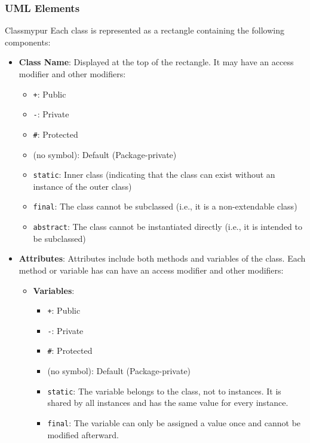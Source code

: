 \subsubsection{UML Elements}


\begin{prettyBox}{Class}{mypur}
Each class is represented as a rectangle containing the following components:
\begin{itemize}
    \item \textbf{Class Name}: Displayed at the top of the rectangle. It may have an access modifier and other modifiers:
    \begin{itemize}
        \item \texttt{+}: Public
        \item \texttt{-}: Private
        \item \texttt{\#}: Protected
        \item (no symbol): Default (Package-private)
        \item \texttt{static}: Inner class (indicating that the class can exist without an instance of the outer class)
        \item \texttt{final}: The class cannot be subclassed (i.e., it is a non-extendable class)
        \item \texttt{abstract}: The class cannot be instantiated directly (i.e., it is intended to be subclassed)
    \end{itemize}
    \item \textbf{Attributes}: Attributes include both methods and variables of the class. Each method or variable has can have an access modifier and other modifiers:
        \begin{itemize}
            \item \textbf{Variables}: 
            \begin{itemize}
                \item \texttt{+}: Public
                \item \texttt{-}: Private
                \item \texttt{\#}: Protected
                \item (no symbol): Default (Package-private)
                \item \texttt{static}: The variable belongs to the class, not to instances. It is shared by all instances and has the same value for every instance.
                \item \texttt{final}: The variable can only be assigned a value once and cannot be modified afterward.

\end{itemize}
\end{itemize}
\end{itemize}
\end{prettyBox}

